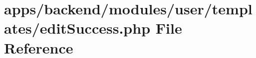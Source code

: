 \hypertarget{backend_2modules_2user_2templates_2edit_success_8php}{\section{apps/backend/modules/user/templates/edit\-Success.php File Reference}
\label{backend_2modules_2user_2templates_2edit_success_8php}
}
